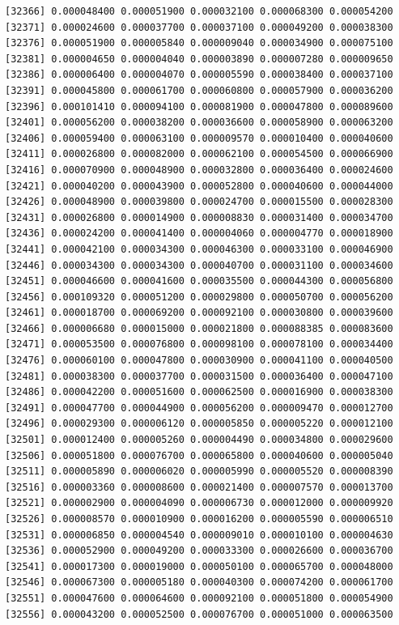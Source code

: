 \documentclass[]{article}
\begin{document}
\begin{verbatim}
[32366] 0.000048400 0.000051900 0.000032100 0.000068300 0.000054200
[32371] 0.000024600 0.000037700 0.000037100 0.000049200 0.000038300
[32376] 0.000051900 0.000005840 0.000009040 0.000034900 0.000075100
[32381] 0.000004650 0.000004040 0.000003890 0.000007280 0.000009650
[32386] 0.000006400 0.000004070 0.000005590 0.000038400 0.000037100
[32391] 0.000045800 0.000061700 0.000060800 0.000057900 0.000036200
[32396] 0.000101410 0.000094100 0.000081900 0.000047800 0.000089600
[32401] 0.000056200 0.000038200 0.000036600 0.000058900 0.000063200
[32406] 0.000059400 0.000063100 0.000009570 0.000010400 0.000040600
[32411] 0.000026800 0.000082000 0.000062100 0.000054500 0.000066900
[32416] 0.000070900 0.000048900 0.000032800 0.000036400 0.000024600
[32421] 0.000040200 0.000043900 0.000052800 0.000040600 0.000044000
[32426] 0.000048900 0.000039800 0.000024700 0.000015500 0.000028300
[32431] 0.000026800 0.000014900 0.000008830 0.000031400 0.000034700
[32436] 0.000024200 0.000041400 0.000004060 0.000004770 0.000018900
[32441] 0.000042100 0.000034300 0.000046300 0.000033100 0.000046900
[32446] 0.000034300 0.000034300 0.000040700 0.000031100 0.000034600
[32451] 0.000046600 0.000041600 0.000035500 0.000044300 0.000056800
[32456] 0.000109320 0.000051200 0.000029800 0.000050700 0.000056200
[32461] 0.000018700 0.000069200 0.000092100 0.000030800 0.000039600
[32466] 0.000006680 0.000015000 0.000021800 0.000088385 0.000083600
[32471] 0.000053500 0.000076800 0.000098100 0.000078100 0.000034400
[32476] 0.000060100 0.000047800 0.000030900 0.000041100 0.000040500
[32481] 0.000038300 0.000037700 0.000031500 0.000036400 0.000047100
[32486] 0.000042200 0.000051600 0.000062500 0.000016900 0.000038300
[32491] 0.000047700 0.000044900 0.000056200 0.000009470 0.000012700
[32496] 0.000029300 0.000006120 0.000005850 0.000005220 0.000012100
[32501] 0.000012400 0.000005260 0.000004490 0.000034800 0.000029600
[32506] 0.000051800 0.000076700 0.000065800 0.000040600 0.000005040
[32511] 0.000005890 0.000006020 0.000005990 0.000005520 0.000008390
[32516] 0.000003360 0.000008600 0.000021400 0.000007570 0.000013700
[32521] 0.000002900 0.000004090 0.000006730 0.000012000 0.000009920
[32526] 0.000008570 0.000010900 0.000016200 0.000005590 0.000006510
[32531] 0.000006850 0.000004540 0.000009010 0.000010100 0.000004630
[32536] 0.000052900 0.000049200 0.000033300 0.000026600 0.000036700
[32541] 0.000017300 0.000019000 0.000050100 0.000065700 0.000048000
[32546] 0.000067300 0.000005180 0.000040300 0.000074200 0.000061700
[32551] 0.000047600 0.000064600 0.000092100 0.000051800 0.000054900
[32556] 0.000043200 0.000052500 0.000076700 0.000051000 0.000063500

\end{verbatim}
\end{document}
